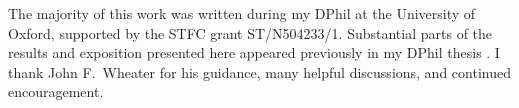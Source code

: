 \acknowledgments
The majority of this work was written during my DPhil at the University of
Oxford, supported by the STFC grant ST/N504233/1. Substantial parts of the results and exposition presented here appeared previously in my DPhil thesis \cite{kulanthaivelu2020spin}. I thank John F.\ Wheater for his guidance,
many helpful discussions, and continued encouragement.
